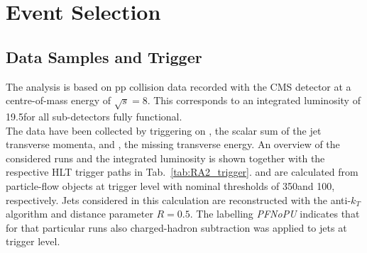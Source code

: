 \section{Event Selection}
\label{sec:RA2_sel}

\subsection{Data Samples and Trigger}
\label{subsec:RA2_samples_trigger}
The analysis is based on pp collision data recorded with the CMS detector at a centre-of-mass energy of $\sqrt{s} = 8$\tev. This corresponds to an integrated luminosity of 19.5\fbinv for all sub-detectors fully functional. \\
The data have been collected by triggering on \HT, the scalar sum of the jet transverse momenta, and \met, the missing transverse energy. An overview of the considered runs and the integrated luminosity is shown together with the respective HLT trigger paths in Tab.~\ref{tab:RA2_trigger}. \HT and \met are calculated from particle-flow objects at trigger level with nominal thresholds of 350\gev and 100\gev, respectively. Jets considered in this calculation are reconstructed with the anti-$k_T$ algorithm and distance parameter $R = 0.5$. The labelling \textit{PFNoPU} indicates that for that particular runs also charged-hadron subtraction was applied to jets at trigger level. \\
\begin{table}[!b]
\centering
\caption{Utilized signal trigger paths in individual run ranges listed together with the integrated luminosity.}
\label{tab:RA2_trigger}
\end{table}  
